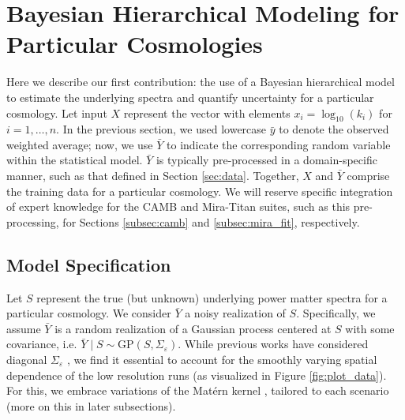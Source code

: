 \documentclass[11pt]{article}
\begin{document}

\section{Bayesian Hierarchical Modeling for Particular Cosmologies}
\label{sec:hm_fit}

Here we describe our first contribution: the use of a Bayesian hierarchical model 
to estimate the underlying spectra and quantify uncertainty for a particular cosmology.
Let input $X$ represent the vector with elements $x_i = \log_{10}(k_i)$ for $i=1,\dots,n$.
In the previous section, we used lowercase $\bar{y}$ to denote 
the observed weighted average; now, we use $\bar{Y}$ to indicate the corresponding 
random variable within the statistical model.  $\bar{Y}$ is typically pre-processed
in a domain-specific manner, such as that defined in Section \ref{sec:data}.
Together, $X$ and $\bar{Y}$ comprise the training data for a particular cosmology.
We will reserve specific integration 
of expert knowledge for the CAMB and Mira-Titan suites, such as this pre-processing,
for Sections \ref{subsec:camb} and \ref{subsec:mira_fit}, respectively.  

\subsection{Model Specification}

Let $S$ represent the true (but unknown) underlying power matter spectra for
a particular cosmology.  We consider $\bar{Y}$ a noisy realization of $S$.
Specifically, we assume $\bar{Y}$ is a random realization of a Gaussian 
process centered at $S$ with some covariance, i.e. 
$\bar{Y}\mid S \sim \mathrm{GP}(S, \Sigma_\varepsilon)$.  While previous works
have considered diagonal $\Sigma_\varepsilon$ \citep{moran2024dpc}, we find it
essential to account for the smoothly varying spatial dependence of the
low resolution runs (as visualized in Figure \ref{fig:plot_data}).  For
this, we embrace variations of the Mat\'ern kernel \citep{stein1999interpolation},
tailored to each scenario (more on this in later subsections).
\end{document}
